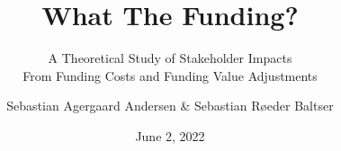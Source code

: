 \title{What The Funding?}
\subtitle{
    A Theoretical Study of Stakeholder Impacts \\
    From Funding Costs and Funding Value Adjustments
}
\author[Andersen \& Baltser]{
    Sebastian Agergaard Andersen \& Sebastian Røeder Baltser
}
\date{June 2, 2022}